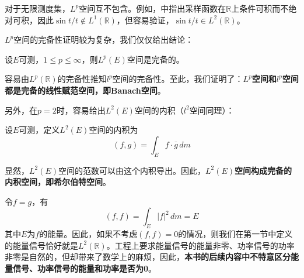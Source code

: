 对于无限测度集，$L^p$空间互不包含。例如，中指出采样函数在$\mathbb{R} $上条件可积而不绝对可积，因此$\sin t/t\notin L^1(\mathbb{R} )$，但容易验证，$\sin t/t\in L^2(\mathbb{R} )$。

$L^p$空间的完备性证明较为复杂，我们仅仅给出结论：
\begin{claim}\label{claim:Lp_complete}
    设$E$可测，$1\leq p\leq \infty$，则$L^p(E)$空间是完备的。
\end{claim}
容易由$L^p(\mathbb{R} )$的完备性推知$l^p$空间的完备性。至此，我们证明了：\textbf{$L^p$空间和$l^p$空间都是完备的线性赋范空间，即Banach空间}。

另外，在$p=2$时，容易给出$L^2(E)$空间的内积（$l^2$空间同理）：
\begin{definition}[$L^2$空间的内积]\label{def:L2_inner_product}
    设$E$可测，定义$L^2(E)$空间的内积为
    \[(f,g)=\int_{E}f\cdot \overline{g}\,dm\]
\end{definition}


显然，$L^2(E)$空间的范数可以由这个内积导出。因此，\textbf{$L^2(E)$空间构成完备的内积空间，即希尔伯特空间}。

令$f=g$，有
$$(f,f)=\int_{E}|f|^2\,dm=E$$
其中$E$为$f$的能量。因此，如果不考虑$(f,f)=0$的情况，则我们在第一节中定义的能量信号恰好就是$L^2(\mathbb{R})$。工程上要求能量信号的能量非零、功率信号的功率非零是自然的，但却带来了数学上的麻烦，因此，\textbf{本书的后续内容中不特意区分能量信号、功率信号的能量和功率是否为0}。





